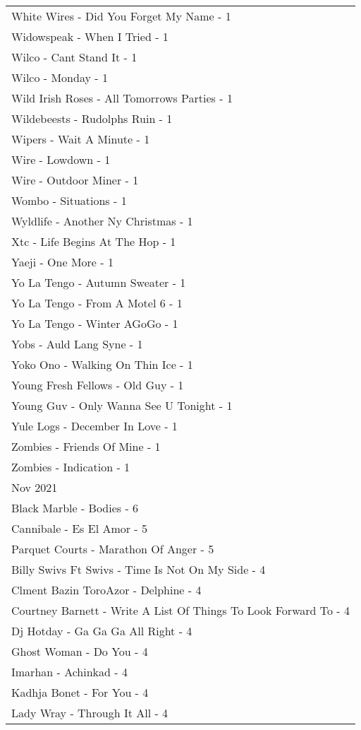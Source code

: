 \documentclass[
]{article}
\begin{document}
\begin{longtable}{l}
White Wires - Did You Forget My Name - 1 \\ 
Widowspeak - When I Tried - 1 \\ 
Wilco - Cant Stand It - 1 \\ 
Wilco - Monday - 1 \\ 
Wild Irish Roses - All Tomorrows Parties - 1 \\ 
Wildebeests - Rudolphs Ruin - 1 \\ 
Wipers - Wait A Minute - 1 \\ 
Wire - Lowdown - 1 \\ 
Wire - Outdoor Miner - 1 \\ 
Wombo - Situations - 1 \\ 
Wyldlife - Another Ny Christmas - 1 \\ 
Xtc - Life Begins At The Hop - 1 \\ 
Yaeji - One More - 1 \\ 
Yo La Tengo - Autumn Sweater - 1 \\ 
Yo La Tengo - From A Motel 6 - 1 \\ 
Yo La Tengo - Winter AGoGo - 1 \\ 
Yobs - Auld Lang Syne - 1 \\ 
Yoko Ono - Walking On Thin Ice - 1 \\ 
Young Fresh Fellows - Old Guy - 1 \\ 
Young Guv - Only Wanna See U Tonight - 1 \\ 
Yule Logs - December In Love - 1 \\ 
Zombies - Friends Of Mine - 1 \\ 
Zombies - Indication - 1 \\ 
\midrule
\multicolumn{1}{l}{Nov 2021} \\ 
\midrule
Black Marble - Bodies - 6 \\ 
Cannibale - Es El Amor - 5 \\ 
Parquet Courts - Marathon Of Anger - 5 \\ 
Billy Swivs Ft Swivs - Time Is Not On My Side - 4 \\ 
Clment Bazin ToroAzor - Delphine - 4 \\ 
Courtney Barnett - Write A List Of Things To Look Forward To - 4 \\ 
Dj Hotday - Ga Ga Ga All Right - 4 \\ 
Ghost Woman - Do You - 4 \\ 
Imarhan - Achinkad - 4 \\ 
Kadhja Bonet - For You - 4 \\ 
Lady Wray - Through It All - 4 \\ 

\end{longtable}
\end{document}
